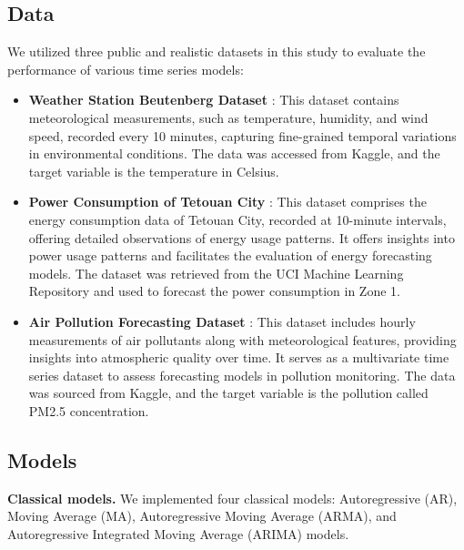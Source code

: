 \documentclass[sn-mathphys-num]{sn-jnl}
\theoremstyle{thmstyleone}%
\theoremstyle{thmstyletwo}%
\theoremstyle{thmstylethree}%
\begin{document}
\subsection{Data}
We utilized three public and realistic datasets in this study to evaluate the performance of various time series models:
\begin{itemize}
    \item \textbf{Weather Station Beutenberg Dataset} \cite{weather2020}: This dataset contains meteorological measurements, such as temperature, humidity, and wind speed, recorded every 10 minutes, capturing fine-grained temporal variations in environmental conditions. The data was accessed from Kaggle, and the target variable is the temperature in Celsius. 
    
    \item \textbf{Power Consumption of Tetouan City} \cite{power_consumption_of_tetouan_city_849}: This dataset comprises the energy consumption data of Tetouan City, recorded at 10-minute intervals,  offering detailed observations of energy usage patterns. It offers insights into power usage patterns and facilitates the evaluation of energy forecasting models. The dataset was retrieved from the UCI Machine Learning Repository and used to forecast the power consumption in Zone 1.
    
    \item \textbf{Air Pollution Forecasting Dataset} \cite{kaggle_lstm_dataset}: This dataset includes hourly measurements of air pollutants along with meteorological features, providing insights into atmospheric quality over time. It serves as a multivariate time series dataset to assess forecasting models in pollution monitoring. The data was sourced from Kaggle, and the target variable is the pollution called PM2.5 concentration.
\end{itemize}

\subsection{Models}

\textbf{Classical models.} We implemented four classical models: Autoregressive (AR), Moving Average (MA), Autoregressive Moving Average (ARMA), and Autoregressive Integrated Moving Average (ARIMA) models.
\end{document}

